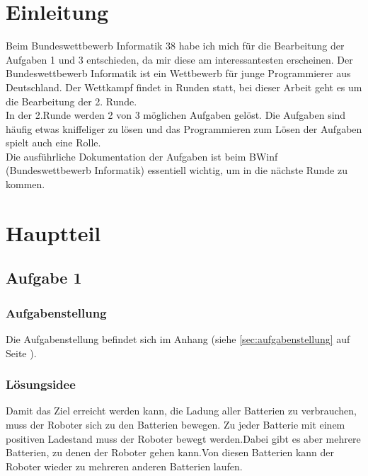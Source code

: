\documentclass[a4paper,12pt,arial]{scrartcl}
\begin{document}
\section{Einleitung}
Beim Bundeswettbewerb Informatik 38 habe ich mich für die Bearbeitung der Aufgaben 1 und 3 entschieden, da mir diese am interessantesten erscheinen. Der Bundeswettbewerb Informatik ist ein Wettbewerb für junge Programmierer aus Deutschland. Der Wettkampf findet in Runden statt, bei dieser Arbeit geht es um die Bearbeitung der 2. Runde.
\\
In der 2.Runde werden 2 von 3 möglichen Aufgaben gelöst. Die Aufgaben sind häufig etwas kniffeliger zu lösen und das Programmieren zum Lösen der Aufgaben spielt auch eine Rolle.\\
Die ausführliche Dokumentation der Aufgaben ist beim BWinf (Bundeswettbewerb Informatik) essentiell wichtig, um in die nächste Runde zu kommen.
\section{Hauptteil}
\newpage
\subsection{Aufgabe 1}
\subsubsection{Aufgabenstellung}
Die Aufgabenstellung befindet sich im Anhang (siehe \ref{sec:aufgabenstellung} auf Seite \pageref{sec:aufgabenstellung}).\textit{\textcite{bwinfSpielfeld}}
\subsubsection{Lösungsidee}
Damit das Ziel erreicht werden kann, die Ladung aller Batterien zu verbrauchen, muss der Roboter sich zu den Batterien bewegen.
Zu jeder Batterie mit einem positiven Ladestand muss der Roboter bewegt werden.Dabei gibt es aber mehrere Batterien, zu denen der Roboter gehen kann.Von diesen Batterien kann der Roboter wieder zu mehreren anderen Batterien laufen.
\par
\end{document}

